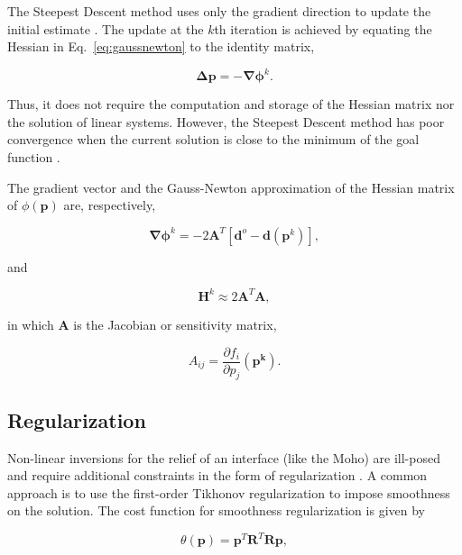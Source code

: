 \documentclass[extra]{gji}
\begin{document}
The Steepest Descent method uses only the gradient direction
to update the initial estimate \citep{kelley1987}.
The update at the $k$th iteration is achieved by equating the Hessian
in Eq.~\ref{eq:gaussnewton} to the identity matrix,

\begin{equation}
    \mathbf{\Delta p} = -\mathbf{\nabla\phi}^k.
    \label{eq:steepest}
\end{equation}

\noindent
Thus, it does not require the computation and storage of the Hessian matrix
nor the solution of linear systems.
However, the Steepest Descent method has poor convergence when the
current solution is close to the minimum of the goal function
\citep{kelley1987}.

The gradient vector and the Gauss-Newton approximation of the Hessian matrix
of $\phi(\mathbf{p})$ are, respectively,

\begin{equation}
    \mathbf{\nabla\phi}^k = -2\mathbf{A}^T[\mathbf{d}^o - \mathbf{d}(\mathbf{p}^k)],
    \label{eq:gradient}
\end{equation}

\noindent
and

\begin{equation}
    \mathbf{H}^k \approx 2\mathbf{A}^T\mathbf{A},
    \label{eq:hessian}
\end{equation}

\noindent in which
$\mathbf{A}$ is the Jacobian or sensitivity matrix,

\begin{equation}
    A_{ij} = \dfrac{\partial f_i}{\partial p_j}(\mathbf{p^k}).
    \label{eq:jacobian}
\end{equation}



\subsection{Regularization}

Non-linear inversions for the relief of an interface (like the Moho)
are ill-posed and require additional constraints in the form of
regularization \citep{silva2001}.
A common approach is to use the first-order Tikhonov regularization to impose
smoothness on the solution.
The cost function for smoothness regularization is given by

\begin{equation}
    \theta(\mathbf{p}) = \mathbf{p}^T\mathbf{R}^T\mathbf{R}\mathbf{p},
    \label{eq:regul}
\end{equation}
\end{document}
